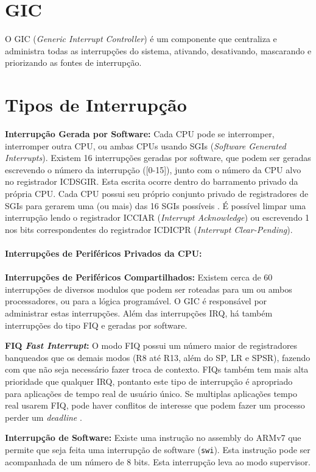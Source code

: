 \section{GIC}
O GIC (\emph{Generic Interrupt Controller}) é um componente que centraliza e administra todas as interrupções do sistema, ativando, desativando, mascarando e priorizando as fontes de interrupção.


\section{Tipos de Interrupção} %
\label{sec:interrupt}
\textbf{Interrupção Gerada por Software: }
Cada CPU pode se interromper, interromper outra CPU, ou ambas CPUs usando SGIs (\emph{Software Generated Interrupts}). Existem 16 interrupções geradas por software, que podem ser geradas escrevendo o número da interrupção ([0-15]), junto com o número da CPU alvo no registrador ICDSGIR. Esta escrita ocorre dentro do barramento privado da própria CPU. Cada CPU possui seu próprio conjunto privado de registradores de SGIs para gerarem uma (ou mais) das 16 SGIs possíveis \cite[p.~216]{ug585.1.7}. É possível limpar uma interrupção lendo o registrador ICCIAR (\emph{Interrupt Acknowledge}) ou escrevendo 1 nos bits correspondentes do registrador ICDICPR (\emph{Interrupt Clear-Pending}).
\\\\
\textbf{Interrupções de Periféricos Privados da CPU: }
\\\\
\textbf{Interrupções de Periféricos Compartilhados: }
Existem cerca de 60 interrupções de diversos modulos que podem ser roteadas para um ou ambos processadores, ou para a lógica programável. O GIC é responsável por administrar estas interrupções. Além das interrupções IRQ, há também interrupções do tipo FIQ e geradas por software.

\textbf{FIQ \emph{Fast Interrupt}:} O modo FIQ possui um número maior de registradores banqueados que os demais modos (R8 até R13, além do SP, LR e SPSR), fazendo com que não seja necessário fazer troca de contexto. FIQs também tem mais alta prioridade que qualquer IRQ, pontanto este tipo de interrupção é apropriado para aplicações de tempo real de usuário único. Se multiplas aplicações tempo real usarem FIQ, pode haver conflitos de interesse que podem fazer um processo perder um \emph{deadline} \cite[p.~66]{armarm}.

\textbf{Interrupção de Software: } Existe uma instrução no assembly do ARMv7 que permite que seja feita uma interrupção de software (\verb+swi+). Esta instrução pode ser acompanhada de um número de 8 bits. Esta interrupção leva ao modo supervisor.

